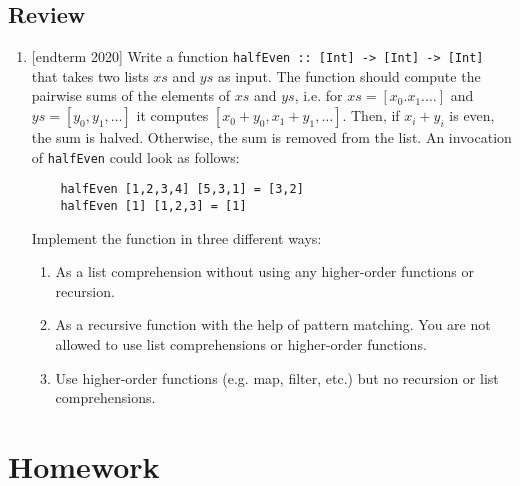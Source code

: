 \documentclass{article}
\begin{document}
\subsection{Review}
\begin{enumerate}
\item {[endterm 2020]} Write a function \verb|halfEven :: [Int] -> [Int] -> [Int]| that takes two lists $xs$ and $ys$ as input. The function should compute the pairwise sums of the elements of $xs$ and $ys$, i.e. for $xs = [x_0. x_1. \dots]$ and $ys = [y_0, y_1, \dots]$ it computes $[x_0 + y_0, x_1 + y_1, \dots]$. Then, if $x_i + y_i$ is even, the sum is halved. Otherwise, the sum is removed from the list. An invocation of \verb|halfEven| could look as follows:
\begin{verbatim}
    halfEven [1,2,3,4] [5,3,1] = [3,2]
    halfEven [1] [1,2,3] = [1]
\end{verbatim}
Implement the function in three different ways:
\begin{enumerate}
\item As a list comprehension without using any higher-order functions or recursion.
\item As a recursive function with the help of pattern matching. You are not allowed to use list comprehensions or higher-order functions.
\item Use higher-order functions (e.g. map, filter, etc.) but no recursion or list comprehensions.
\end{enumerate}
\end{enumerate}

\newpage

\section{Homework}
\end{document}
